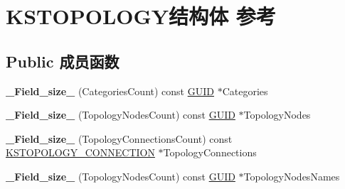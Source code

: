 \hypertarget{struct_k_s_t_o_p_o_l_o_g_y}{}\section{K\+S\+T\+O\+P\+O\+L\+O\+G\+Y结构体 参考}
\label{struct_k_s_t_o_p_o_l_o_g_y}
\subsection*{Public 成员函数}
\begin{DoxyCompactItemize}
\item 
\mbox{\label{struct_k_s_t_o_p_o_l_o_g_y_ab505b904e1544c9082b320dd175e928e}} 
{\bfseries \+\_\+\+Field\+\_\+size\+\_\+} (Categories\+Count) const \hyperlink{interface_g_u_i_d}{G\+U\+ID} $\ast$Categories
\item 
\mbox{\label{struct_k_s_t_o_p_o_l_o_g_y_af7572aa5c1ec4f84baf0b6a841394531}} 
{\bfseries \+\_\+\+Field\+\_\+size\+\_\+} (Topology\+Nodes\+Count) const \hyperlink{interface_g_u_i_d}{G\+U\+ID} $\ast$Topology\+Nodes
\item 
\mbox{\label{struct_k_s_t_o_p_o_l_o_g_y_af35b003ccc9bf11624825721fdf88a03}} 
{\bfseries \+\_\+\+Field\+\_\+size\+\_\+} (Topology\+Connections\+Count) const \hyperlink{struct_k_s_t_o_p_o_l_o_g_y___c_o_n_n_e_c_t_i_o_n}{K\+S\+T\+O\+P\+O\+L\+O\+G\+Y\+\_\+\+C\+O\+N\+N\+E\+C\+T\+I\+ON} $\ast$Topology\+Connections
\item 
\mbox{\label{struct_k_s_t_o_p_o_l_o_g_y_a01541877460e3ff8bec30f442e08be0a}} 
{\bfseries \+\_\+\+Field\+\_\+size\+\_\+} (Topology\+Nodes\+Count) const \hyperlink{interface_g_u_i_d}{G\+U\+ID} $\ast$Topology\+Nodes\+Names
\end{DoxyCompactItemize}
